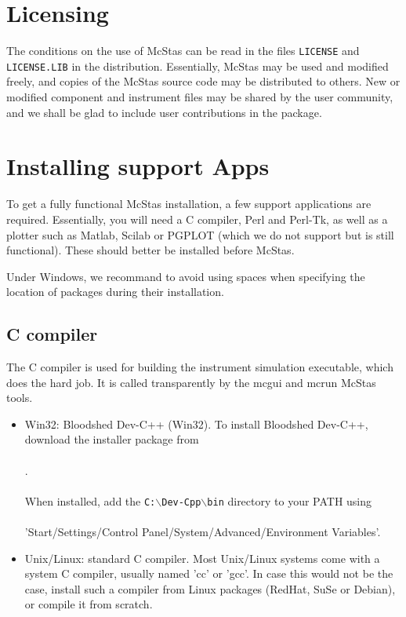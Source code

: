 \label{s:install}
\section{Licensing}
The conditions on the use of McStas can be read in the files
\verb+LICENSE+ and \verb+LICENSE.LIB+ in the distribution. Essentially,
McStas may be used and modified freely, and copies of the McStas source code 
may be distributed to others. 
New or modified component and instrument files may be shared by 
the user community, and we shall be glad to include user contributions in the package.

\section{Installing support Apps}

To get a fully functional McStas installation, a few support applications are required. Essentially, you will need a C compiler, Perl and Perl-Tk, as well as a plotter such as Matlab, Scilab or PGPLOT (which we do not support but is still functional). These should better be installed before McStas.

Under Windows, we recommand to avoid using spaces when specifying the location of packages during their installation.

\subsection{C compiler}
\label{s:Ccompiler}

The C compiler is used for building the instrument simulation executable, which does the hard job. It is called transparently by the mcgui and mcrun McStas tools.

\begin{itemize}
\item{Win32: Bloodshed Dev-C++ (Win32).
  \label{s:instblood}
  To install Bloodshed Dev-C++, download the installer package from
  \\\
  \\.\\\
  \\
  When installed, add the \texttt{C:$\backslash$Dev-Cpp$\backslash$bin} directory to your PATH
  using\\\ \\
  'Start/Settings/Control Panel/System/Advanced/Environment Variables'.
}
\item{Unix/Linux: standard C compiler.
  Most Unix/Linux systems come with a system C compiler, usually named 'cc' or 'gcc'. In case this would not be the case, install such a compiler from Linux packages (RedHat, SuSe or Debian), or compile it from scratch. 
}
\end{itemize}

